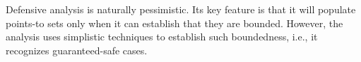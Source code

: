







Defensive analysis is naturally pessimistic. Its key feature is that it will populate points-to sets only when it can establish that they are bounded. However, the analysis uses simplistic techniques to establish such boundedness, i.e., it recognizes guaranteed-safe cases.

